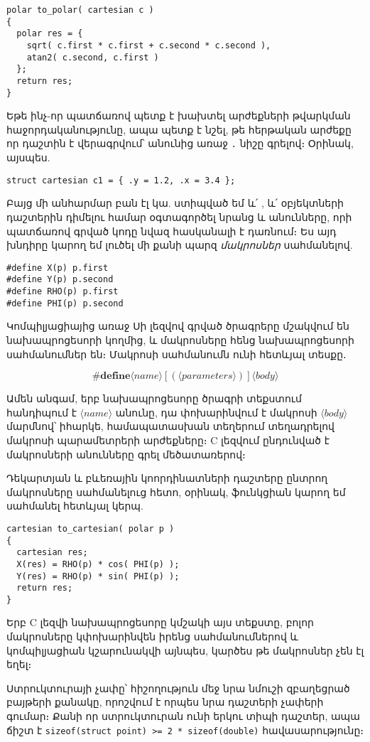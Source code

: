 \begin{Verbatim}
polar to_polar( cartesian c )
{
  polar res = {
    sqrt( c.first * c.first + c.second * c.second ),
    atan2( c.second, c.first )
  };
  return res;
}
\end{Verbatim}

Եթե ինչ-որ պատճառով պետք է խախտել արժեքների թվարկման հաջորդականությունը,
ապա պետք է նշել, թե հերթական արժեքը որ դաշտին է վերագրվում՝ անունից առաջ
\Verb|.| նիշը գրելով։ Օրինակ, այսպես.

\begin{Verbatim}
struct cartesian c1 = { .y = 1.2, .x = 3.4 };
\end{Verbatim}

Բայց մի անհարմար բան էլ կա. ստիպված եմ և՛ , և՛
 օբյեկտների դաշտերին դիմելու համար օգտագործել նրանց
 և  անունները, որի պատճառով գրված կոդը նվազ
հասկանալի է դառնում։ Ես այդ խնդիրը կարող եմ լուծել մի քանի պարզ
\emph{մակրոսներ} սահմանելով.

\begin{Verbatim}
#define X(p) p.first
#define Y(p) p.second
#define RHO(p) p.first
#define PHI(p) p.second
\end{Verbatim}

Կոմպիլյացիայից առաջ Սի լեզվով գրված ծրագրերը մշակվում են նախապրոցեսորի
կողմից, և մակրոսները հենց նախապրոցեսորի սահմանումներ են։ Մակրոսի
սահմանումն ունի հետևյալ տեսքը․

\[
\mathbf{\#define} \langle name\rangle[(\langle parameters\rangle)] \langle body\rangle
\]

Ամեն անգամ, երբ նախապրոցեսորը ծրագրի տեքստում հանդիպում է
\(\langle name\rangle\) անունը, դա փոխարինվում է մակրոսի
\(\langle body\rangle\) մարմնով՝ իհարկե, համապատասխան տեղերում տեղադրելով
մակրոսի պարամետրերի արժեքները։ C լեզվում ընդունված է մակրոսների անունները
գրել մեծատառերով։

Դեկարտյան և բևեռային կոորդինատների դաշտերը ընտրող մակրոսները սահմանելուց
հետո, օրինակ,  ֆունկցիան կարող եմ սահմանել հետևյալ կերպ.

\begin{Verbatim}
cartesian to_cartesian( polar p )
{
  cartesian res;
  X(res) = RHO(p) * cos( PHI(p) );
  Y(res) = RHO(p) * sin( PHI(p) );
  return res;
}
\end{Verbatim}

Երբ C լեզվի նախապրոցեսորը կմշակի այս տեքստը, բոլոր մակրոսները կփոխարինվեն
իրենց սահմանումներով և կոմպիլյացիան կշարունակվի այնպես, կարծես թե մակրոսներ
չեն էլ եղել։

Ստրուկտուրայի չափը՝ հիշողություն մեջ նրա նմուշի զբաղեցրած բայթերի քանակը,
որոշվում է որպես նրա դաշտերի չափերի գումար։ Քանի որ 
ստրուկտուրան ունի երկու  տիպի դաշտեր, ապա ճիշտ է
\texttt{sizeof(struct point) >= 2 * sizeof(double)} հավասարությունը։
